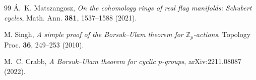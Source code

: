 \documentclass[11pt,a4paper]{article}
\begin{document}
\begin{thebibliography}{99}
\'A.~K. Matszangosz, \emph{On the cohomology rings of real flag manifolds:
Schubert cycles}, Math. Ann. \textbf{381}, 1537--1588 (2021).

M. Singh, \emph{A simple proof of the Borsuk--Ulam theorem for
$\mathbb Z_p$-actions}, Topology Proc. \textbf{36}, 249--253 (2010).

M.~C. Crabb, \emph{A Borsuk--Ulam theorem for cyclic $p$-groups},
arXiv:2211.08087 (2022).

\end{thebibliography}
\end{document}
